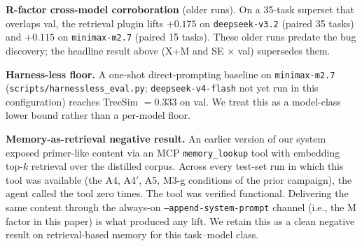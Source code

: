 \documentclass{article}
\begin{document}
\begin{table}[h]
  \caption{Full cross-model and cross-harness panel. Counts in parentheses are task failures out of 17.}
  \label{tab:cross-cutting-full}
  \centering
  \small
\end{table}

\textbf{R-factor cross-model corroboration} (older runs). On a 35-task superset that overlaps val, the retrieval plugin lifts $+0.175$ on \texttt{deepseek-v3.2} (paired 35 tasks) and $+0.115$ on \texttt{minimax-m2.7} (paired 15 tasks). These older runs predate the bug discovery; the headline result above (X+M and SE × val) supersedes them.

\textbf{Harness-less floor.} A one-shot direct-prompting baseline on \texttt{minimax-m2.7} (\texttt{scripts/harnessless\_eval.py}; \texttt{deepseek-v4-flash} not yet run in this configuration) reaches TreeSim $= 0.333$ on val. We treat this as a model-class lower bound rather than a per-model floor.

\textbf{Memory-as-retrieval negative result.} An earlier version of our system exposed primer-like content via an MCP \texttt{memory\_lookup} tool with embedding top-$k$ retrieval over the distilled corpus. Across every test-set run in which this tool was available (the A4, A4$'$, A5, M3-g conditions of the prior campaign), the agent called the tool zero times. The tool was verified functional. Delivering the same content through the always-on \texttt{--append-system-prompt} channel (i.e., the M factor in this paper) is what produced any lift. We retain this as a clean negative result on retrieval-based memory for this task--model class.
\end{document}
